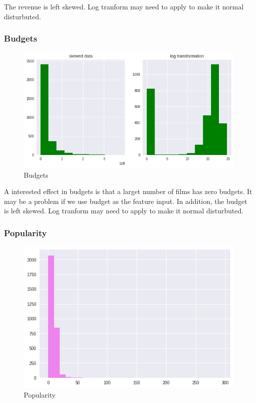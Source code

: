 \documentclass{article}
\begin{document}
The revenue is left skewed. Log tranform may need to apply to make it normal disturbuted.

\subsubsection{Budgets}
\begin{figure}[h]
  \centering
  \includegraphics[scale=0.7]{budget.png}
  \caption{Budgets}
\end{figure}

A interested effect in budgets is that a larget number of films has zero budgets. It may be a problem if we use budget as the feature input.
In addition, the budget is left skewed. Log tranform may need to apply to make it normal disturbuted.

\pagebreak


\subsubsection{Popularity}
\begin{figure}[h]
  \centering
  \includegraphics[scale=0.7]{popularity.png}
  \caption{Popularity}
\end{figure}
\end{document}
